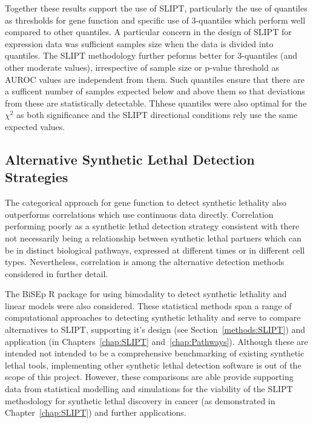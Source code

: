 Together these results support the use of \gls{SLIPT}, particularly the use of quantiles as thresholds for gene function and specific use of 3-quantiles which perform well compared to other quantiles. A particular concern in the design of \gls{SLIPT} for expression data was sufficient samples size when the data is divided into quantiles. The \gls{SLIPT} methodology further peforms better for 3-quantiles (and other moderate values), irrespective of sample size or p-value threshold as \gls{AUROC} values are independent from them. Such quantiles ensure that there are a sufficent number of samples expected below and above them so that deviations from these are statistically detectable. Thhese quantiles were also optimal for the $\chi^2$ as both significance and the \gls{SLIPT} directional conditions rely use the same expected values.

\FloatBarrier

\subsection{Alternative Synthetic Lethal Detection Strategies}

The categorical approach for gene function to detect synthetic lethality also outperforms correlations which use continuous data directly. Correlation performing poorly as a synthetic lethal detection strategy consistent with there not necessarily being a relationship between synthetic lethal partners which can be in distinct biological pathways, expressed at different times or in different cell types. Nevertheless, correlation is among the alternative detection methods considered in further detail.

The \gls{BiSEp} R package \citep{Wappett2014} for using bimodality to detect synthetic lethality \citep{Wappett2016} and linear models were also considered. These statistical methods span a range of computational approaches to detecting synthetic lethality and serve to compare alternatives to \gls{SLIPT}, supporting it's design (see Section~\ref{methods:SLIPT}) and application (in Chapters~\ref{chap:SLIPT} and~\ref{chap:Pathways}). Although these are intended not intended to be a comprehensive benchmarking of existing synthetic lethal tools, implementing other synthetic lethal detection software is out of the scope of this project. However, these comparisons are able provide supporting data from statistical modelling and simulations for the viability of the \gls{SLIPT} methodology for synthetic lethal discovery in cancer (as demonstrated in Chapter~\ref{chap:SLIPT}) and further applications.

